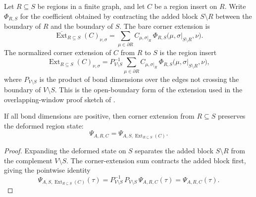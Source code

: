 \begin{definition}
    \label{def:peps_corner_extension}
    \leanok
    Let $R\subseteq S$ be regions in a finite graph, and let $C$ be a region
    insert on $R$.  Write $\Phi_{R,S}$ for the coefficient obtained by
    contracting the added block $S\setminus R$ between the boundary of $R$ and
    the boundary of $S$.  The bare corner extension is
    \[
        \overline{\operatorname{Ext}}_{R\subseteq S}(C)_{\nu,\sigma}
        =
        \sum_{\mu\in \partial R}
        C_{\mu,\sigma|_R}\,
        \Phi_{R,S}\bigl(\mu,\sigma|_{S\setminus R},\nu\bigr).
    \]
    The normalized corner extension of $C$ from $R$ to $S$ is the region insert
    \[
        \operatorname{Ext}_{R\subseteq S}(C)_{\nu,\sigma}
        =
        P_{V\setminus S}^{-1}
        \sum_{\mu\in \partial R}
        C_{\mu,\sigma|_R}\,
        \Phi_{R,S}\bigl(\mu,\sigma|_{S\setminus R},\nu\bigr),
    \]
    where $P_{V\setminus S}$ is the product of bond dimensions over the edges
    not crossing the boundary of $V\setminus S$.  This is the open-boundary
    form of the extension used in the overlapping-window proof sketch of
    \cite[Section~4, proof of Theorem~3]{Molnar2018NormalPEPS}.
\end{definition}

\begin{theorem}
    \label{thm:peps_corner_extension_state_preserves}
    \leanok
    If all bond dimensions are positive, then corner extension from
    $R\subseteq S$ preserves the deformed region state:
    \[
        \Psi_{A,R,C}
        =
        \Psi_{A,S,\operatorname{Ext}_{R\subseteq S}(C)}.
    \]
\end{theorem}
\begin{proof}
    \leanok
    Expanding the deformed state on $S$ separates the added block
    $S\setminus R$ from the complement $V\setminus S$.  The corner-extension
    sum contracts the added block first, giving the pointwise identity
    \[
        \Psi_{A,S,\operatorname{Ext}_{R\subseteq S}(C)}(\tau)
        =
        P_{V\setminus S}^{-1}\,P_{V\setminus S}\,
        \Psi_{A,R,C}(\tau)
        =
        \Psi_{A,R,C}(\tau).
    \]
\end{proof}

